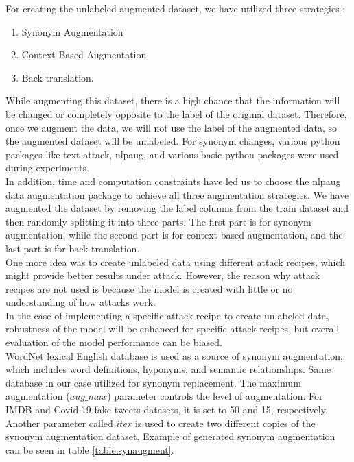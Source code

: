 \documentclass[%
	BCOR=8mm, %
	DIV=12,
	toc=bibliography, %
	toc=listof, %
	oneside, %
	egregdoesnotlikesansseriftitles, %
	]{scrbook}
\begin{document}
For creating the unlabeled augmented dataset, we have utilized three strategies :
\begin{enumerate}
\item  Synonym Augmentation
\item Context Based Augmentation
\item Back translation.
\end{enumerate}
While augmenting this dataset, there is a high chance that the information will be changed or completely opposite to the label of the original dataset. Therefore, once we augment the data, we will not use the label of the augmented data, so the augmented dataset will be unlabeled. For synonym changes, various python packages like text attack, nlpaug, and various basic python packages were used during experiments.\\
In addition, time and computation constraints have led us to choose the nlpaug data augmentation package \cite{ma_nlpaug_2022} to achieve all three augmentation strategies. We have augmented the dataset by removing the label columns from the train dataset and then randomly splitting it into three parts. The first part is for synonym augmentation, while the second part is for context based augmentation, and the last part is for back translation.\\
One more idea was to create unlabeled data using different attack recipes, which might provide better results under attack. However, the reason why attack recipes are not used is because the model is created with little or no understanding of how attacks work. \\
In the case of implementing a specific attack recipe to create unlabeled data,  robustness of the model will be enhanced for specific attack recipes, but overall evaluation of the model performance can be biased.\\
WordNet lexical English database \cite{miller_wordnet_1995} is used as a source of synonym augmentation, which includes word definitions, hyponyms, and semantic relationships. Same database in our case utilized for synonym replacement. The maximum augmentation ($aug\_max$) parameter controls the level of augmentation. For IMDB and Covid-19  fake tweets datasets, it is set to 50 and 15, respectively. Another parameter called $iter$ is used to create two different copies of the synonym augmentation dataset. Example of generated synonym augmentation can be seen in table \ref{table:synaugment}.\\
\end{document}
